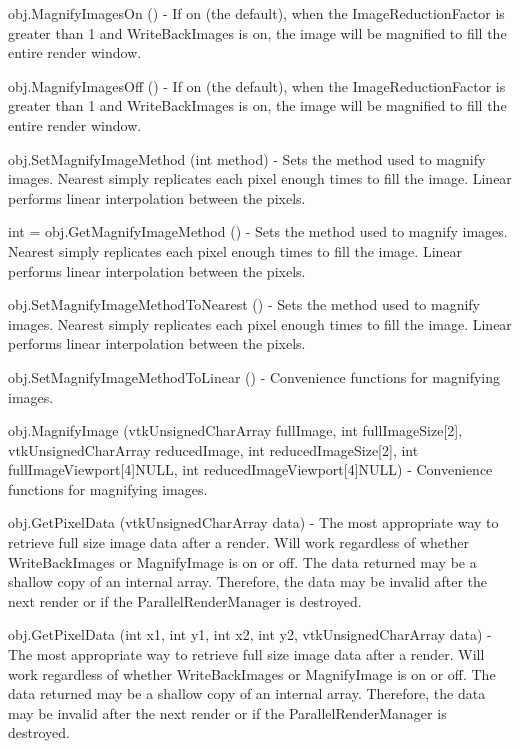 \begin{DoxyItemize}
\item {\ttfamily obj.\-Magnify\-Images\-On ()} -\/ If on (the default), when the Image\-Reduction\-Factor is greater than 1 and Write\-Back\-Images is on, the image will be magnified to fill the entire render window.  
\item {\ttfamily obj.\-Magnify\-Images\-Off ()} -\/ If on (the default), when the Image\-Reduction\-Factor is greater than 1 and Write\-Back\-Images is on, the image will be magnified to fill the entire render window.  
\item {\ttfamily obj.\-Set\-Magnify\-Image\-Method (int method)} -\/ Sets the method used to magnify images. Nearest simply replicates each pixel enough times to fill the image. Linear performs linear interpolation between the pixels.  
\item {\ttfamily int = obj.\-Get\-Magnify\-Image\-Method ()} -\/ Sets the method used to magnify images. Nearest simply replicates each pixel enough times to fill the image. Linear performs linear interpolation between the pixels.  
\item {\ttfamily obj.\-Set\-Magnify\-Image\-Method\-To\-Nearest ()} -\/ Sets the method used to magnify images. Nearest simply replicates each pixel enough times to fill the image. Linear performs linear interpolation between the pixels.  
\item {\ttfamily obj.\-Set\-Magnify\-Image\-Method\-To\-Linear ()} -\/ Convenience functions for magnifying images.  
\item {\ttfamily obj.\-Magnify\-Image (vtk\-Unsigned\-Char\-Array full\-Image, int full\-Image\-Size\mbox{[}2\mbox{]}, vtk\-Unsigned\-Char\-Array reduced\-Image, int reduced\-Image\-Size\mbox{[}2\mbox{]}, int full\-Image\-Viewport\mbox{[}4\mbox{]}N\-U\-L\-L, int reduced\-Image\-Viewport\mbox{[}4\mbox{]}N\-U\-L\-L)} -\/ Convenience functions for magnifying images.  
\item {\ttfamily obj.\-Get\-Pixel\-Data (vtk\-Unsigned\-Char\-Array data)} -\/ The most appropriate way to retrieve full size image data after a render. Will work regardless of whether Write\-Back\-Images or Magnify\-Image is on or off. The data returned may be a shallow copy of an internal array. Therefore, the data may be invalid after the next render or if the Parallel\-Render\-Manager is destroyed.  
\item {\ttfamily obj.\-Get\-Pixel\-Data (int x1, int y1, int x2, int y2, vtk\-Unsigned\-Char\-Array data)} -\/ The most appropriate way to retrieve full size image data after a render. Will work regardless of whether Write\-Back\-Images or Magnify\-Image is on or off. The data returned may be a shallow copy of an internal array. Therefore, the data may be invalid after the next render or if the Parallel\-Render\-Manager is destroyed.  

\end{DoxyItemize}
